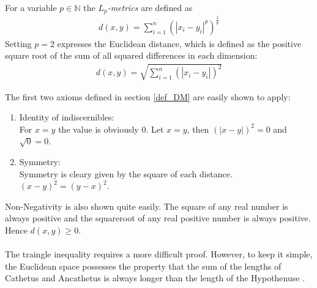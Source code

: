 For a variable $p \in \mathbb{N}$ the $L_p$\textit{-metrics} are defined as
\begin{align} \label{lpmetric}
    d(x, y) = \sum_{i=1}^{n}(|x_i-y_i|^p)^\frac{1}{p}
\end{align}
Setting $p = 2$ expresses the Euclidean distance, which is defined as the positive square root of the sum of all squared differences in each dimension:
\begin{align}
    d(x, y) = \sqrt{\sum_{i = 1}^{n}(|x_i - y_i|)^2}
\end{align}

The first two axioms defined in section \ref{def_DM} are easily shown to apply:
\begin{enumerate}

\item Identity of indiscernibles:\\
For $x = y$ the value is obviously $0$. Let $x = y$, then $(|x - y|)^2 = 0$ and $\sqrt{0} = 0$.

\item Symmetry: \\
Symmetry is cleary given by the square of each distance.\\
$(x - y)^2 = (y - x)^2$.
\end{enumerate}

Non-Negativity is also shown quite easily. The square of any real number is always positive and the squareroot of any real positive number is always positive. Hence $d(x, y) \geq 0$.\\
\ \\
The traingle inequality requires a more difficult proof. However, to keep it simple, the Euclidean space possesses the property that the sum of the lengths of Cathetus and Ancathetus is always longer than the length of the Hypothenuse \cite{MMDS}.